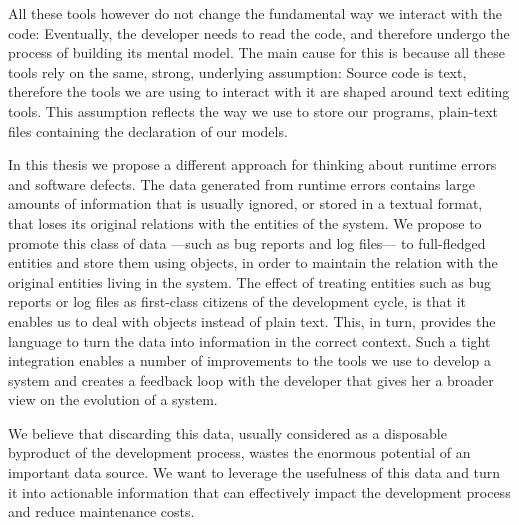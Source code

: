 All these tools however do not change the fundamental way we interact with the code: Eventually, the developer needs to read the code, and therefore undergo the process of building its mental model.
The main cause for this is because all these tools rely on the same, strong, underlying assumption: Source code is text, therefore the tools we are using to interact with it are shaped around text editing tools.
This assumption reflects the way we use to store our programs, \ie plain-text files containing the declaration of our models.


In this thesis we propose a different approach for thinking about runtime errors and software defects.
The data generated from runtime errors contains large amounts of information that is usually ignored, or stored in a textual format, that loses its original relations with the entities of the system.
We propose to promote this class of data ---such as bug reports and log files--- to full-fledged entities and store them using objects, in order to maintain the relation with the original entities living in the system.
The effect of treating entities such as bug reports or log files as first-class citizens of the development cycle, is that it enables us to deal with objects instead of plain text.
This, in turn, provides the language to turn the data into information in the correct context.
Such a tight integration enables a number of improvements to the tools we use to develop a system and creates a feedback loop with the developer that gives her a broader view on the evolution of a system.

We believe that discarding this data, usually considered as a disposable byproduct of the development process, wastes the enormous potential of an important data source.
We want to leverage the usefulness of this data and turn it into actionable information that can effectively impact the development process and reduce maintenance costs.

